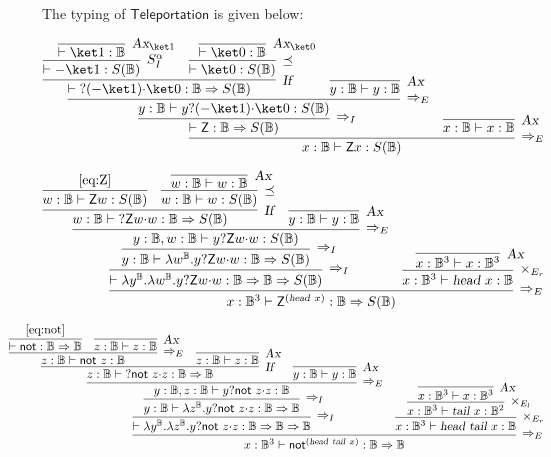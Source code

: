 \documentclass[preprint]{elsarticle}
\newcommand\B{\ensuremath{\mathbb B}}
\newcommand\ite[3]{{#1}?{#2}\mathord{\cdot}{#3}}
\newcommand\s[1]{\ensuremath{\mathsf{#1}}}
\newcommand\head{\text{\sl head}}
\newcommand\tail{\text{\sl tail}}
\newcommand\tax{\textsl{Ax}}
\newcommand\tif{\textsl{If}}
\begin{document}
The typing of $\s{Teleportation}$ is given below:

\begin{equation}
  \label{eq:Z}
  \infer[\Rightarrow_E]
  {x:\B\vdash \s Zx:S(\B)}
  {
    \infer[\Rightarrow_I]
    {\vdash \s Z:\B\Rightarrow S(\B)}
    {
      \infer[\Rightarrow_E]
      {y:\B\vdash\ite y{(-\ket 1)}{\ket 0}: S(\B)}
      {
        \infer[\tif]{\vdash\ite{}{(-\ket 1)}{\ket 0}:\B\Rightarrow S(\B)}
        {
          \infer[S_I^\alpha]{\vdash -\ket 1:S(\B)}
          {
            \infer[\tax_{\ket 1}]{\vdash\ket 1:\B}{}
          }
          &
          \infer[\preceq]{\vdash\ket 0:S(\B)}
          {
            \infer[\tax_{\ket 0}]{\vdash\ket 0:\B}{}
          }
        }
        &
        \infer[\tax]{y:\B\vdash y:\B}{}
      }
    }
    &
    \infer[\tax]{x:\B\vdash x:\B}{}
  }
\end{equation}

\begin{equation}
  \label{eq:Zpot}
  \infer[\Rightarrow_E]
  {x:\B^3\vdash \s Z^{(\head\ x)}:\B\Rightarrow S(\B)}
  {
    \infer[\Rightarrow_I]
    {\vdash\lambda y^\B.\lambda w^\B.\ite y{\s Zw}w:\B\Rightarrow\B\Rightarrow S(\B)}
    {
      \infer[\Rightarrow_I]
      {y:\B\vdash\lambda w^\B.\ite y{\s Zw}w:\B\Rightarrow S(\B)}
      {
        \infer[\Rightarrow_E]{y:\B,w:\B\vdash\ite y{\s Zw}w:S(\B)}
        {
          \infer[\tif]{w:\B\vdash\ite{}{\s Zw}w:\B\Rightarrow S(\B)}
          {
            \infer
            {w:\B\vdash \s Zw:S(\B)}
            {\eqref{eq:Z}}
            &
            \infer[\preceq]
            {w:\B\vdash w:S(\B)}
            {
              \infer[\tax]{w:\B\vdash w:\B}{}
            }
          }
          &
          \infer[\tax]{y:\B\vdash y:\B}{}
        }
      }
    }
    &
    \infer[\times_{E_r}]
    {x:\B^3\vdash\head\ x:\B}
    {
      \infer[\tax]
      {x:\B^3\vdash x:\B^3}
      {}
    }
  }
\end{equation}

\begin{equation}
  \label{eq:Notpot}
  \hspace{-1cm}\infer[\Rightarrow_E]
  {x:\B^3\vdash \s{not}^{(\head\ \tail\ x)}:\B\Rightarrow\B}
  {
    \infer[\Rightarrow_I]
    {\vdash\lambda y^\B.\lambda z^\B.\ite y{\s{not}\ z}z:\B\Rightarrow\B\Rightarrow\B}
    {
      \infer[\Rightarrow_I]
      {y:\B\vdash\lambda z^\B.\ite y{\s{not}\ z}z:\B\Rightarrow\B}
      {
        \infer[\Rightarrow_E]
        {y:\B,z:\B\vdash\ite y{\s{not}\ z}z:\B}
        {
          \infer[\tif]
          {z:\B\vdash\ite{}{\s{not}\ z}z:\B\Rightarrow\B}
          {
            \infer[\Rightarrow_E]
            {z:\B\vdash \s{not}\ z:\B}
            {
              \infer
              {\vdash \s{not}:\B\Rightarrow\B}
              {\eqref{eq:not}}
              &
              \infer[\tax]
              {z:\B\vdash z:\B}
              {}
            }
            &
            \infer[\tax]
            {z:\B\vdash z:\B}
            {}
          }
          &
          \infer[\tax]{y:\B\vdash y:\B}{}
        }
      }
    }
    &
    \infer[\times_{E_r}]
    {x:\B^3\vdash\head\ \tail\ x:\B}
    {
      \infer[\times_{E_l}]
      {x:\B^3\vdash\tail\ x:\B^2}
      {\infer[\tax]{x:\B^3\vdash x:\B^3}{}}
    }
  }
\end{equation}
\end{document}
